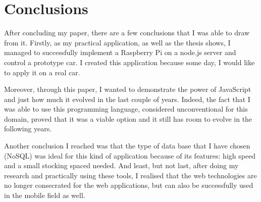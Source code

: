 
\chapter{Conclusions} %

\label{Chapter5} %



After concluding my paper, there are a few conclusions that I was able to draw from it. Firstly, as my practical application, as well as the thesis shows, I managed to successfully implement a Raspberry Pi on a node.js server and control a prototype car. I created this application because some day, I would like to apply it on a real car. 


Moreover, through this paper, I wanted to demonstrate the power of JavaScript and just how much it evolved in the last couple of years. Indeed, the fact that I was able to use this programming language, considered unconventional for this domain, proved that it was a viable option and it still has room to evolve in the following years. 


Another conclusion I reached was that the type of data base that I have chosen (NoSQL) was ideal for this kind of application because of its features: high speed and a small stocking spaced needed. And least, but not last, after doing my research and practically using these tools, I realised that the web technologies are no longer consecrated for the web applications, but can also be successfully used in the mobile field as well.